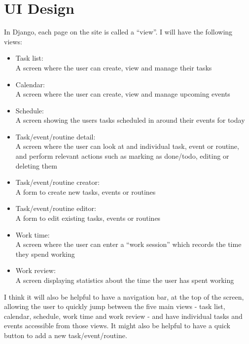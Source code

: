 \documentclass{article}
\begin{document}
\section{UI Design}
In Django,
each page on the site is called a ``view''.
I will have the following views:
\begin{samepage}
	\begin{itemize}
		\item Task list:\\
		      A screen where the user can create, view and manage their tasks
		\item Calendar:\\
		      A screen where the user can create, view and manage upcoming events
		\item Schedule:\\
		      A screen showing the users tasks scheduled in around their events for today
		\item Task/event/routine detail:\\
		      A screen where the user can look at and individual task, event or routine,
		      and perform relevant actions such as marking as done/todo,
		      editing or deleting them
		\item Task/event/routine creator:\\
		      A form to create new tasks, events or routines
		\item Task/event/routine editor:\\
		      A form to edit existing tasks, events or routines
		\item Work time:\\
		      A screen where the user can enter a ``work session'' which records the time they spend working
		\item Work review:\\
		      A screen displaying statistics about the time the user has spent working
	\end{itemize}
\end{samepage}

I think it will also be helpful to have a navigation bar,
at the top of the screen,
allowing the user to quickly jump between the five main views -
task list, calendar, schedule, work time and work review -
and have individual tasks and events accessible from those views.
It might also be helpful to have a quick button to add a new task/event/routine.
\end{document}
